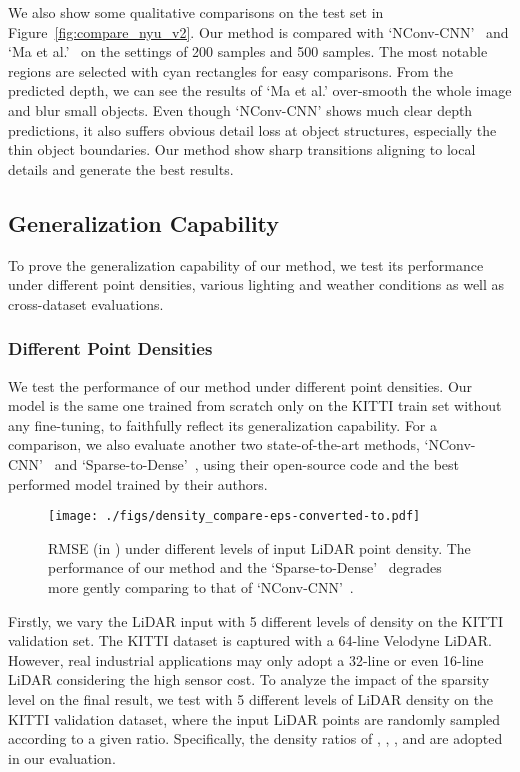 \documentclass[journal]{IEEEtran}
\begin{document}
We also show some qualitative comparisons on the test set in Figure~\ref{fig:compare_nyu_v2}.
Our method is compared with `NConv-CNN'~\cite{cnn_confidence} and `Ma et al.'~\cite{sparse_to_dense} on the settings of 200 samples and 500 samples.
The most notable regions are selected with cyan rectangles for easy comparisons.
From the predicted depth, we can see the results of `Ma et al.' over-smooth the whole image and blur small objects. 
Even though `NConv-CNN' shows much clear depth predictions, it also suffers obvious detail loss at object structures, especially the thin object boundaries.
Our method show sharp transitions aligning to local details and generate the best results.

\subsection{Generalization Capability}
\label{subsec:generalization_capability}
To prove the generalization capability of our method,
we test its performance under different point densities, various lighting and weather conditions as well as cross-dataset evaluations.


\subsubsection{Different Point Densities}
We test the performance of our method under different point densities.
Our model is the same one trained from scratch only on the KITTI train set without any fine-tuning, to faithfully reflect its generalization capability.
For a comparison, we also evaluate another two state-of-the-art methods, `NConv-CNN'~\cite{cnn_confidence} and `Sparse-to-Dense'~\cite{self_supervised},
using their open-source code and the best performed model trained by their authors. 


\begin{figure}
   \begin{center}
   \texttt{[image: ./figs/density\_compare-eps-converted-to.pdf]}
   \end{center}
      \caption{
      RMSE (in ) under different levels of input LiDAR point density. The performance of our method and the `Sparse-to-Dense'~\cite{self_supervised} degrades more gently comparing to that of `NConv-CNN'~\cite{cnn_confidence}. }
   \label{fig:density_compare}
\end{figure}

Firstly, we vary the LiDAR input with 5 different levels of density on the KITTI validation set. 
The KITTI dataset is captured with a 64-line Velodyne LiDAR.
However, real industrial applications may only adopt a 32-line or even 16-line LiDAR considering the high sensor cost.
To analyze the impact of the sparsity level on the final result, we test with 5 different levels of LiDAR density on the KITTI validation dataset,
where the input LiDAR points are randomly sampled according to a given ratio.
Specifically, the density ratios of , , ,  and  are adopted in our evaluation. 
\end{document}
